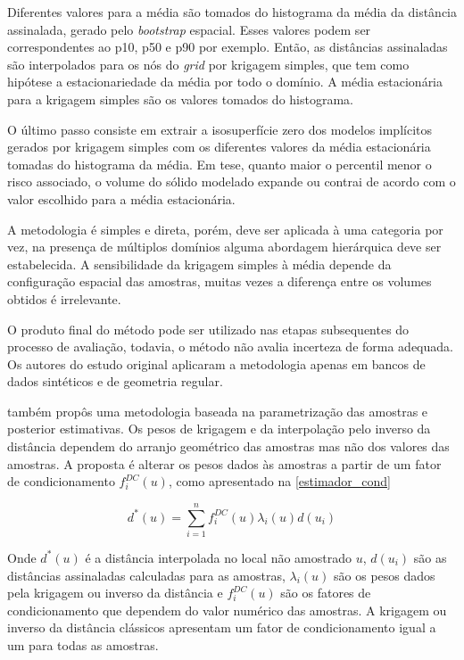 Diferentes valores para a média são tomados do histograma da média da distância assinalada, gerado pelo \textit{bootstrap} espacial. Esses valores podem ser correspondentes ao p10, p50 e p90 por exemplo. Então, as distâncias assinaladas são interpolados para os nós do \textit{grid} por krigagem simples, que tem como hipótese a estacionariedade da média por todo o domínio. A média estacionária para a krigagem simples são os valores tomados do histograma.

O último passo consiste em extrair a isosuperfície zero dos modelos implícitos gerados por krigagem simples com os diferentes valores da média estacionária tomadas do histograma da média. Em tese, quanto maior o percentil menor o risco associado, o volume do sólido modelado expande ou contrai de acordo com o valor escolhido para a média estacionária.

A metodologia é simples e direta, porém, deve ser aplicada à uma categoria por vez, na presença de múltiplos domínios alguma abordagem hierárquica deve ser estabelecida. A sensibilidade da krigagem simples à média depende da configuração espacial das amostras, muitas vezes a diferença entre os volumes obtidos é irrelevante.

O produto final do método pode ser utilizado nas etapas subsequentes do processo de avaliação, todavia, o método não avalia incerteza de forma adequada. Os autores do estudo original aplicaram a metodologia apenas em bancos de dados sintéticos e de geometria regular. 

\label{chap:cond_amo}

 também propôs uma metodologia baseada na parametrização das amostras e posterior estimativas. Os pesos de krigagem e da interpolação pelo inverso da distância dependem do arranjo geométrico das amostras mas não dos valores das amostras. A proposta é alterar os pesos dados às amostras a partir de um fator de condicionamento $f^{DC}_i(u)$, como apresentado na \autoref{estimador_cond}

\begin{equation}
\label{estimador_cond}
d^*(u)=\sum_{i=1}^{n} f^{DC}_i(u) \lambda_i(u) d(u_i)
\end{equation}

Onde $d^*(u)$ é a distância interpolada no local não amostrado $u$, $d(u_i)$ são as distâncias assinaladas calculadas para as amostras, $\lambda_i(u)$ são os pesos dados pela krigagem ou inverso da distância e $f^{DC}_i(u)$ são os fatores de condicionamento que dependem do valor numérico das amostras. A krigagem ou inverso da distância clássicos apresentam um fator de condicionamento igual a um para todas as amostras.

